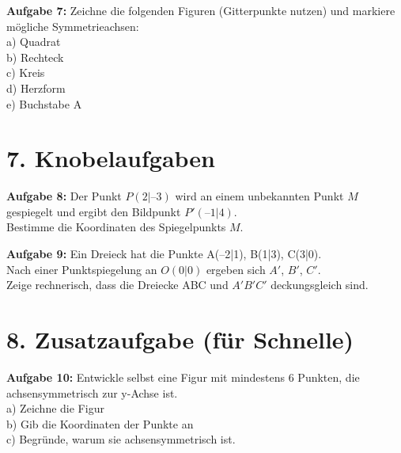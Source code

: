 \textbf{Aufgabe 7:} Zeichne die folgenden Figuren (Gitterpunkte nutzen) und markiere mögliche Symmetrieachsen: \\
a) Quadrat \\
b) Rechteck \\
c) Kreis \\
d) Herzform \\
e) Buchstabe A

\vspace{1cm}

\section*{7. Knobelaufgaben}

\textbf{Aufgabe 8:} Der Punkt \( P(2|–3) \) wird an einem unbekannten Punkt \( M \) gespiegelt und ergibt den Bildpunkt \( P'(–1|4) \). \\
Bestimme die Koordinaten des Spiegelpunkts \( M \).

\vspace{0.5cm}

\textbf{Aufgabe 9:} Ein Dreieck hat die Punkte A(–2|1), B(1|3), C(3|0). \\
Nach einer Punktspiegelung an \( O(0|0) \) ergeben sich \( A' \), \( B' \), \( C' \). \\
Zeige rechnerisch, dass die Dreiecke ABC und \( A'B'C' \) deckungsgleich sind.

\vspace{1cm}

\section*{8. Zusatzaufgabe (für Schnelle)}

\textbf{Aufgabe 10:} Entwickle selbst eine Figur mit mindestens 6 Punkten, die achsensymmetrisch zur y-Achse ist. \\
a) Zeichne die Figur \\
b) Gib die Koordinaten der Punkte an \\
c) Begründe, warum sie achsensymmetrisch ist.